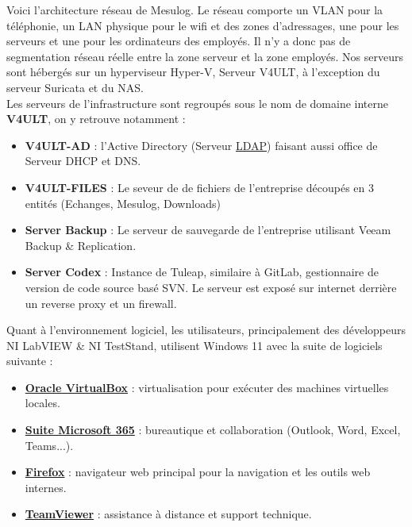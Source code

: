 \documentclass[a4paper, 11pt]{article}
\begin{document}
Voici l'architecture réseau de Mesulog. Le réseau comporte un VLAN pour la téléphonie, un LAN physique pour le wifi et des zones d'adressages, une pour les serveurs et une pour les ordinateurs des employés. Il n'y a donc pas de segmentation réseau réelle entre la zone serveur et la zone employés.
Nos serveurs sont hébergés sur un hyperviseur Hyper-V, Serveur V4ULT, à l'exception du serveur Suricata et du NAS.\\
Les serveurs de l'infrastructure sont regroupés sous le nom de domaine interne \textbf{V4ULT}, on y retrouve notamment :
\par\bigskip
 \begin{itemize}
  \item[$\bullet$] \textbf{V4ULT-AD} : l'Active Directory (Serveur \href{https://fr.wikipedia.org/wiki/LDAP}{LDAP}) faisant aussi office de Serveur DHCP et DNS.
  \item[$\bullet$] \textbf{V4ULT-FILES} : Le seveur de de fichiers de l'entreprise découpés en 3 entités (Echanges, Mesulog, Downloads)
  \item[$\bullet$] \textbf{Server Backup} : Le serveur de sauvegarde de l'entreprise utilisant Veeam Backup \& Replication.
  \item[$\bullet$] \textbf{Server Codex} : Instance de Tuleap, similaire à GitLab, gestionnaire de version de code source basé SVN. Le serveur est exposé sur internet derrière un reverse proxy et un firewall.
 \end{itemize}
\par\bigskip
Quant à l'environnement logiciel, les utilisateurs, principalement des développeurs NI LabVIEW \& NI TestStand, utilisent Windows 11 avec la suite de logiciels suivante :
\par\bigskip

\begin{itemize}
  \item[$\bullet$] \textbf{\href{https://www.virtualbox.org/}{Oracle VirtualBox}} : virtualisation pour exécuter des machines virtuelles locales.
  \item[$\bullet$] \textbf{\href{https://www.microsoft.com/fr-fr/microsoft-365/}{Suite Microsoft 365}} : bureautique et collaboration (Outlook, Word, Excel, Teams...).
  \item[$\bullet$] \textbf{\href{https://www.mozilla.org/fr/firefox/}{Firefox}} : navigateur web principal pour la navigation et les outils web internes.
  \item[$\bullet$] \textbf{\href{https://www.teamviewer.com/}{TeamViewer}} : assistance à distance et support technique.
\end{itemize}
\par\bigskip
\end{document}
